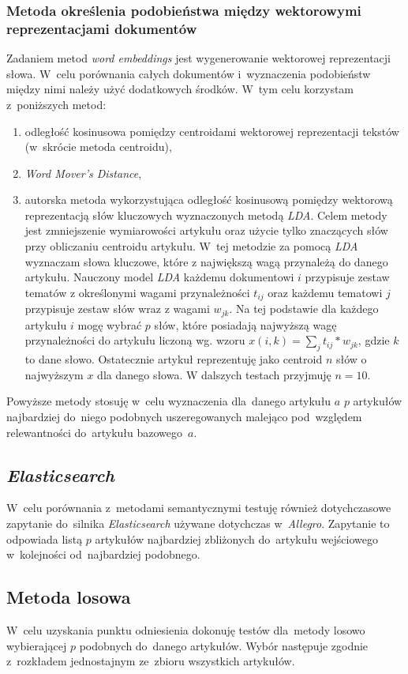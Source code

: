 \documentclass[pl]{minipw} %
\begin{document}
\subsubsection{Metoda określenia podobieństwa między wektorowymi reprezentacjami dokumentów}
Zadaniem metod \textit{word embeddings} jest wygenerowanie wektorowej reprezentacji słowa. W~celu porównania całych dokumentów i~wyznaczenia podobieństw między nimi należy użyć dodatkowych środków. W~tym celu korzystam z~poniższych metod:
\begin{enumerate}
	\item odległość kosinusowa pomiędzy centroidami wektorowej reprezentacji tekstów (w~skrócie metoda centroidu),
	\item \textit{Word Mover's Distance},
	\item autorska metoda wykorzystująca odległość kosinusową pomiędzy wektorową reprezentacją słów kluczowych wyznaczonych metodą \textit{LDA}. Celem metody jest zmniejszenie wymiarowości artykułu oraz użycie tylko znaczących słów przy obliczaniu centroidu artykułu. W~tej metodzie za pomocą \textit{LDA} wyznaczam słowa kluczowe, które z największą wagą przynależą do danego artykułu. Nauczony model \textit{LDA} każdemu dokumentowi $i$ przypisuje zestaw tematów z określonymi wagami przynależności $t_{ij}$ oraz każdemu tematowi $j$ przypisuje zestaw słów wraz z wagami $w_{jk}$. Na tej podstawie dla każdego artykułu $i$ mogę wybrać $p$ słów, które posiadają najwyższą wagę przynależności do artykułu liczoną wg. wzoru $x(i,k)=\sum_{j}t_{ij}*w_{jk}$, gdzie $k$ to dane słowo. Ostatecznie artykuł reprezentuję jako centroid $n$ słów o najwyższym $x$ dla danego słowa. W dalszych testach przyjmuję $n=10$.
\end{enumerate}

Powyższe metody stosuję w~celu wyznaczenia dla~danego artykułu $a$ $p$ artykułów najbardziej do~niego podobnych uszeregowanych malejąco pod~względem relewantności do~artykułu bazowego~$a$.

\subsection{\textit{Elasticsearch}}
W~celu porównania z~metodami semantycznymi testuję również dotychczasowe zapytanie do~silnika \textit{Elasticsearch} używane dotychczas w~\textit{Allegro}. Zapytanie to odpowiada listą $p$ artykułów najbardziej zbliżonych do~artykułu wejściowego w~kolejności od~najbardziej podobnego.

\subsection{Metoda losowa}
W~celu uzyskania punktu odniesienia dokonuję testów dla~metody losowo wybierającej $p$ podobnych do~danego artykułów. Wybór następuje zgodnie z~rozkładem jednostajnym ze~zbioru wszystkich artykułów.
\end{document}
